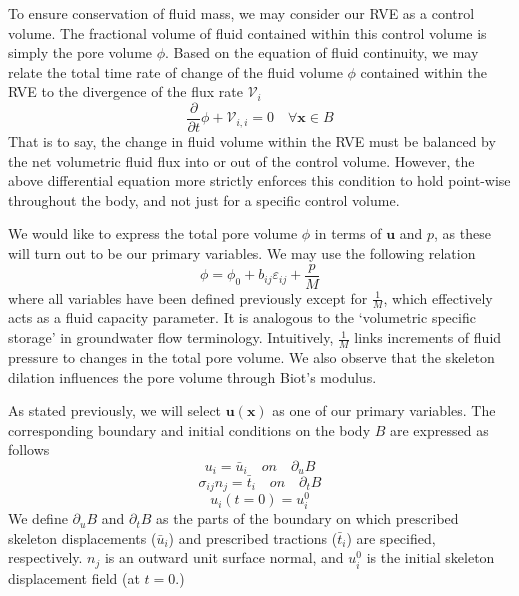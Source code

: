 \documentclass[11pt]{article} %
\begin{document}
To ensure conservation of fluid mass, we may consider our RVE as a control volume. The fractional volume of fluid contained within this control volume is simply the pore volume $\phi$. Based on the equation of fluid continuity, we may relate the total time rate of change of the fluid volume $\phi$ contained within the RVE to the divergence of the flux rate $\mathcal{V}_i$
\begin{equation}
	\frac{\partial}{\partial t} \phi + \mathcal{V}_{i,i} = 0 \quad \forall \mathbf{x} \in B
\end{equation}
That is to say, the change in fluid volume within the RVE must be balanced by the net volumetric fluid flux into or out of the control volume. However, the above differential equation more strictly enforces this condition to hold point-wise throughout the body, and not just for a specific control volume.

We would like to express the total pore volume $\phi$ in terms of $\mathbf{u}$ and $p$, as these will turn out to be our primary variables. We may use the following relation
\begin{equation}
	\phi = \phi_0 + b_{ij} \varepsilon_{ij} + \frac{p}{M}
\end{equation}
where all variables have been defined previously except for $\frac{1}{M}$, which effectively acts as a fluid capacity parameter. It is analogous to the `volumetric specific storage' in groundwater flow terminology. Intuitively, $\frac{1}{M}$ links increments of fluid pressure to changes in the total pore volume. We also observe that the skeleton dilation influences the pore volume through Biot's modulus.

As stated previously, we will select $\mathbf{u}(\mathbf{x})$ as one of our primary variables. The corresponding boundary and initial conditions on the body $B$ are expressed as follows
\begin{equation}
	u_i = \bar{u}_i \quad on \quad \partial_u B
\end{equation}
\begin{equation}
	\sigma_{ij} n_j = \bar{t}_i \quad on \quad \partial_t B
\end{equation}
\begin{equation}
	u_i (t=0) = u_i^0
\end{equation}
We define $\partial_u B$ and $\partial_t B$ as the parts of the boundary on which prescribed skeleton displacements ($\bar{u}_i$) and prescribed tractions ($\bar{t}_i$) are specified, respectively. $n_j$ is an outward unit surface normal, and $u^0_i$ is the initial skeleton displacement field (at $t=0$.)
\end{document}
